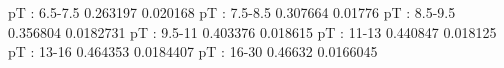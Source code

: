 pT : 6.5-7.5
0.263197 0.020168
pT : 7.5-8.5
0.307664 0.01776
pT : 8.5-9.5
0.356804 0.0182731
pT : 9.5-11
0.403376 0.018615
pT : 11-13
0.440847 0.018125
pT : 13-16
0.464353 0.0184407
pT : 16-30
0.46632 0.0166045

